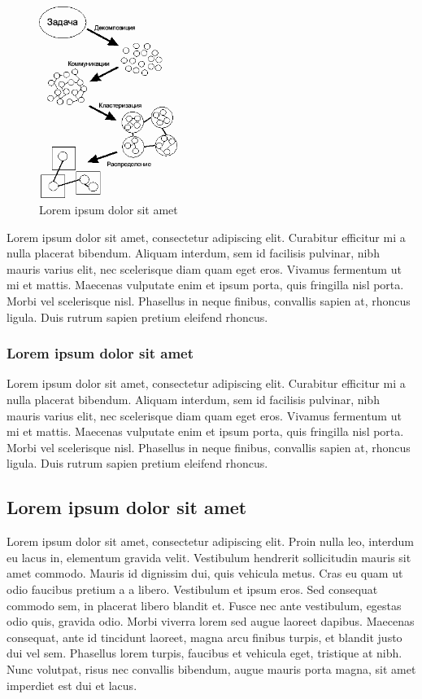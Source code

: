 \begin{figure}[h!]
	\centering
	\includegraphics[width=0.4\textwidth]{img/img1.png}
	\caption{Lorem ipsum dolor sit amet}
	\label{fig:spire05}
\end{figure}

Lorem ipsum dolor sit amet, consectetur adipiscing elit. Curabitur efficitur mi a nulla placerat bibendum. Aliquam interdum, sem id facilisis pulvinar, nibh mauris varius elit, nec scelerisque diam quam eget eros. Vivamus fermentum ut mi et mattis. Maecenas vulputate enim et ipsum porta, quis fringilla nisl porta. Morbi vel scelerisque nisl. Phasellus in neque finibus, convallis sapien at, rhoncus ligula. Duis rutrum sapien pretium eleifend rhoncus.

\subsubsection{Lorem ipsum dolor sit amet} 

Lorem ipsum dolor sit amet, consectetur adipiscing elit. Curabitur efficitur mi a nulla placerat bibendum. Aliquam interdum, sem id facilisis pulvinar, nibh mauris varius elit, nec scelerisque diam quam eget eros. Vivamus fermentum ut mi et mattis. Maecenas vulputate enim et ipsum porta, quis fringilla nisl porta. Morbi vel scelerisque nisl. Phasellus in neque finibus, convallis sapien at, rhoncus ligula. Duis rutrum sapien pretium eleifend rhoncus.


\subsection{Lorem ipsum dolor sit amet}

Lorem ipsum dolor sit amet, consectetur adipiscing elit. Proin nulla leo, interdum eu lacus in, elementum gravida velit. Vestibulum hendrerit sollicitudin mauris sit amet commodo. Mauris id dignissim dui, quis vehicula metus. Cras eu quam ut odio faucibus pretium a a libero. Vestibulum et ipsum eros. Sed consequat commodo sem, in placerat libero blandit et. Fusce nec ante vestibulum, egestas odio quis, gravida odio. Morbi viverra lorem sed augue laoreet dapibus. Maecenas consequat, ante id tincidunt laoreet, magna arcu finibus turpis, et blandit justo dui vel sem. Phasellus lorem turpis, faucibus et vehicula eget, tristique at nibh. Nunc volutpat, risus nec convallis bibendum, augue mauris porta magna, sit amet imperdiet est dui et lacus.

